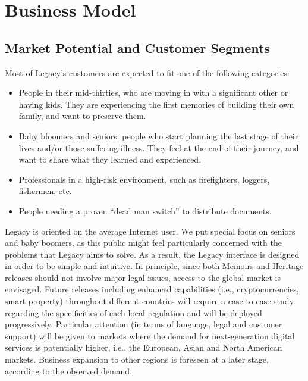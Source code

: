\chapter{Business Model} %
\label{cha:business_model}


\section{Market Potential and Customer Segments} %
\label{sec:markt_potential_and_customer_segments}
Most of Legacy’s customers are expected to fit one of the following categories:
\begin{itemize}
	\item People in their mid-thirties, who are moving in with a significant other or having kids. They are experiencing the first memories of building their own family, and want to preserve them.
	\item Baby bfoomers and seniors: people who start planning the last stage of their lives and/or those suffering illness. They feel at the end of their journey, and want to share what they learned and experienced.
	\item Professionals in a high-risk environment, such as firefighters, loggers, fishermen, etc.
	\item People needing a proven “dead man switch” to distribute documents.
\end{itemize}

Legacy is oriented on the average Internet user. We put special focus on seniors  and baby boomers, as this public might feel particularly concerned with the problems that Legacy aims to solve. As a result, the Legacy interface is designed in order to be simple and intuitive. In principle, since both Memoirs and Heritage releases should not involve major legal issues, access to the global market is envisaged. Future releases including enhanced capabilities (i.e., cryptocurrencies, smart property) throughout different countries will require a case-to-case study regarding the specificities of each local regulation and will be deployed progressively. Particular attention (in terms of language, legal and customer support) will be given to markets where the demand for next-generation digital services is potentially higher, i.e., the European, Asian and North American markets. Business expansion to other regions is foreseen at a later stage, according to the observed demand.  


